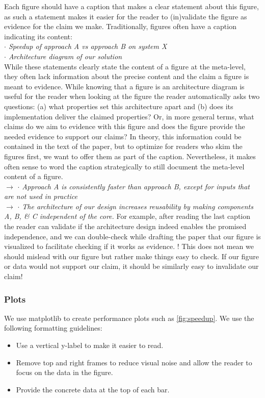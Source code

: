 \documentclass[sigplan]{acmart}
\newenvironment{draftonly}{}{}
\begin{document}
\begin{draftonly}
Each figure should have a caption that makes a clear statement about this
figure, as such a statement makes it easier for the reader to (in)validate the
figure as evidence for the claim we make. Traditionally, figures often have a
caption indicating its content:\\ {\color{pairedTwoDarkBlue} \textit{$\cdot$
Speedup of approach A vs approach B on system X}}\\ {\color{pairedTwoDarkBlue}
\textit{$\cdot$ Architecture diagram of our solution}}\\ While these statements
clearly state the content of a figure at the meta-level, they often lack
information about the precise content and the claim a figure is meant to
evidence. While knowing that a figure is an architecture diagram is useful for
the reader when looking at the figure the reader automatically asks two
questions: (a) what properties set this architecture apart and (b) does its
implementation deliver the claimed properties? Or, in more general terms, what
claims do we aim to evidence with this figure and does the figure provide the
needed evidence to support our claims? In theory, this information could be
contained in the text of the paper, but to optimize for readers who skim the
figures first, we want to offer them as part of the caption. Nevertheless, it
makes often sense to word the caption strategically to still document the
meta-level content of a figure.\\ $\to$ {\color{pairedFourDarkGreen}
\textit{$\cdot$ Approach A is consistently faster than approach B, except for
inputs that are not used in practice}}\\ $\to$ {\color{pairedFourDarkGreen}
\textit{$\cdot$ The architecture of our design increases reusability by making
components A, B, \& C independent of the core.}} For example, after reading the
last caption the reader can validate if the architecture design indeed enables
the promised independence, and we can double-check while drafting the paper that
our figure is visualized to facilitate checking if it works as evidence. ! This
does not mean we should mislead with our figure but rather make things easy to
check. If our figure or data would not support our claim, it should be similarly
easy to invalidate our claim!

\subsubsection{Plots} We use matplotlib to create performance
plots such as \autoref{fig:speedup}. We use the following
formatting guidelines:
\begin{itemize}
  \item Use a vertical y-label to make it easier to read.
  \item Remove top and right frames to reduce visual noise
	and allow the reader to focus on the data in the
	figure.
  \item Provide the concrete data at the top of each bar.
\end{itemize}


\end{draftonly}
\end{document}
